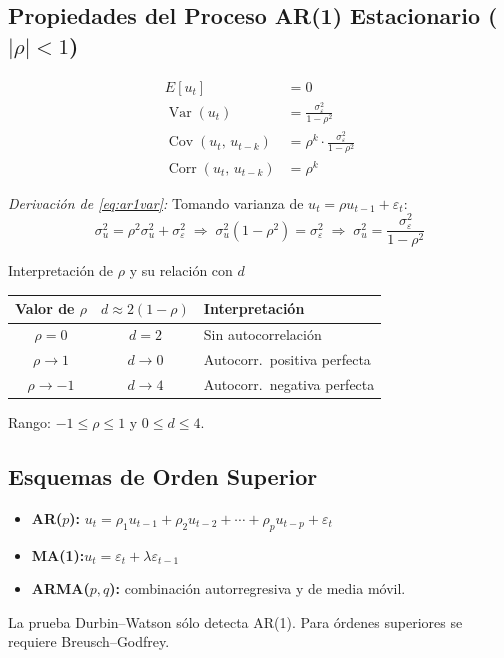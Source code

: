 \documentclass[11pt, letterpaper]{article}
\begin{document}
\subsection{Propiedades del Proceso AR(1) Estacionario ($|\rho|<1$)}

\begin{align}
  E[u_t] &= 0 \label{eq:ar1mean}\\[4pt]
  \operatorname{Var}(u_t) &= \frac{\sigma_\varepsilon^2}{1-\rho^2}
    \label{eq:ar1var}\\[4pt]
  \operatorname{Cov}(u_t,\, u_{t-k}) &= \rho^k \cdot
    \frac{\sigma_\varepsilon^2}{1-\rho^2}
    \label{eq:ar1cov}\\[4pt]
  \operatorname{Corr}(u_t,\, u_{t-k}) &= \rho^k
    \label{eq:ar1corr}
\end{align}

\noindent\textit{Derivaci\'on de \eqref{eq:ar1var}:}
Tomando varianza de $u_t = \rho u_{t-1}+\varepsilon_t$:
\[
  \sigma_u^2 = \rho^2\sigma_u^2 + \sigma_\varepsilon^2
  \;\Rightarrow\;
  \sigma_u^2(1-\rho^2) = \sigma_\varepsilon^2
  \;\Rightarrow\;
  \sigma_u^2 = \frac{\sigma_\varepsilon^2}{1-\rho^2}
\]

\begin{nota}{Interpretaci\'on de $\rho$ y su relaci\'on con $d$}
\begin{center}
\begin{tabular}{ccl}
\toprule
\textbf{Valor de $\rho$} & $d \approx 2(1-\rho)$ & \textbf{Interpretaci\'on}\\
\midrule
$\rho = 0$    & $d = 2$ & Sin autocorrelaci\'on\\
$\rho \to 1$  & $d \to 0$ & Autocorr.\ positiva perfecta\\
$\rho \to -1$ & $d \to 4$ & Autocorr.\ negativa perfecta\\
\bottomrule
\end{tabular}
\end{center}
Rango: $-1 \leq \rho \leq 1$ y $0 \leq d \leq 4$.
\end{nota}

\subsection{Esquemas de Orden Superior}

\begin{itemize}
  \item \textbf{AR($p$):}\quad
    $u_t = \rho_1 u_{t-1} + \rho_2 u_{t-2} + \cdots + \rho_p u_{t-p} + \varepsilon_t$
  \item \textbf{MA(1):}\quad $u_t = \varepsilon_t + \lambda\varepsilon_{t-1}$
  \item \textbf{ARMA($p,q$):} combinaci\'on autorregresiva y de media m\'ovil.
\end{itemize}
La prueba Durbin--Watson s\'olo detecta AR(1). Para \'ordenes superiores se
requiere Breusch--Godfrey.
\end{document}

